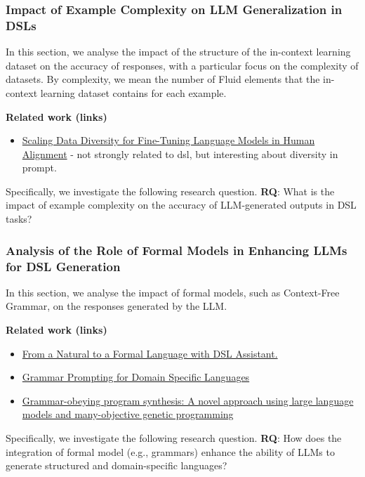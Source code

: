 \subsubsection{Impact of Example Complexity on LLM Generalization in DSLs}
In this section, we analyse the impact of the structure of the in-context learning dataset on the accuracy of responses, with a particular focus on the complexity of datasets.
By complexity, we mean the number of Fluid elements that the in-context learning dataset contains for each example.

\textbf{Related work (links)}
\begin{itemize}
    \item \href{http://www.lrec-conf.org/proceedings/lrec-coling-2024/pdf/2024.main-1.1251.pdf}{Scaling Data Diversity for Fine-Tuning Language Models in Human Alignment} - not strongly related to dsl, but interesting about diversity in prompt.
\end{itemize}

Specifically, we investigate the following research question.
\textbf{RQ}: What is the impact of example complexity on the accuracy of LLM-generated outputs in DSL tasks?

\subsubsection{Analysis of the Role of Formal Models in Enhancing LLMs for DSL Generation}

In this section, we analyse the impact of formal models, such as Context-Free Grammar, on the responses generated by the LLM.

\textbf{Related work (links)}
\begin{itemize}
    \item \href{https://dl.acm.org/doi/10.1145/3652620.3687811}{From a Natural to a Formal Language with DSL Assistant.}
    \item \href{https://proceedings.neurips.cc/paper_files/paper/2023/file/cd40d0d65bfebb894ccc9ea822b47fa8-Paper-Conference.pdf}{Grammar Prompting for Domain Specific Languages}
    \item \href{https://www.sciencedirect.com/science/article/abs/pii/S0920548924001077}{Grammar-obeying program synthesis: A novel approach using large language models and many-objective genetic programming}
\end{itemize}

Specifically, we investigate the following research question.
\textbf{RQ}: How does the integration of formal model (e.g., grammars) enhance the ability of LLMs to generate structured and domain-specific languages?


